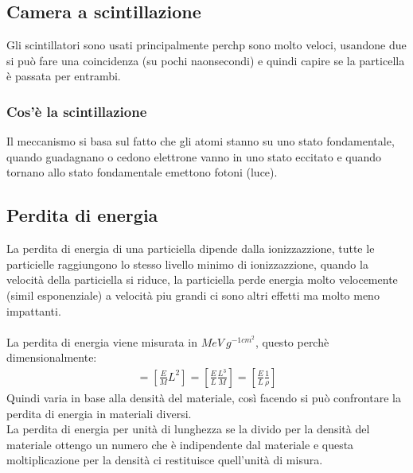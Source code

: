 \documentclass[a4paper, oneside]{article}
\begin{document}
\subsection{Camera a scintillazione}
Gli scintillatori sono usati principalmente perchp sono molto veloci, usandone due si può fare una coincidenza (su pochi naonsecondi) e quindi capire se la particella è passata per entrambi.\\
\subsubsection{Cos'è la scintillazione}
Il meccanismo si basa sul fatto che gli atomi stanno su uno stato fondamentale, quando guadagnano o cedono elettrone vanno in uno stato eccitato e quando tornano allo stato fondamentale emettono fotoni (luce).\\


\subsection{Perdita di energia}
La perdita di energia di una particiella dipende dalla ionizzazzione, tutte le particielle raggiungono lo stesso livello minimo di ionizzazzione, quando la velocità della particiella si riduce, la particiella perde energia molto velocemente (simil esponenziale) a velocità piu grandi ci sono altri effetti ma molto meno impattanti.\\\\
La perdita di energia viene misurata in $MeV \ g^{-1cm^2}$, questo perchè dimensionalmente:
\begin{gather*}
    [\frac{dE}{dx}] = [\frac{E}{M} L^2] = [\frac{E}{L} \frac{L^3}{M}] = [\frac{E}{L} \frac{1}{\rho}]
\end{gather*}
Quindi varia in base alla densità del materiale, così facendo si può confrontare la perdita di energia in materiali diversi.\\
La perdita di energia per unità di lunghezza se la divido per la densità del materiale ottengo un numero che è indipendente dal materiale e questa moltiplicazione per la densità ci restituisce quell'unità di misura.\\
\end{document}
